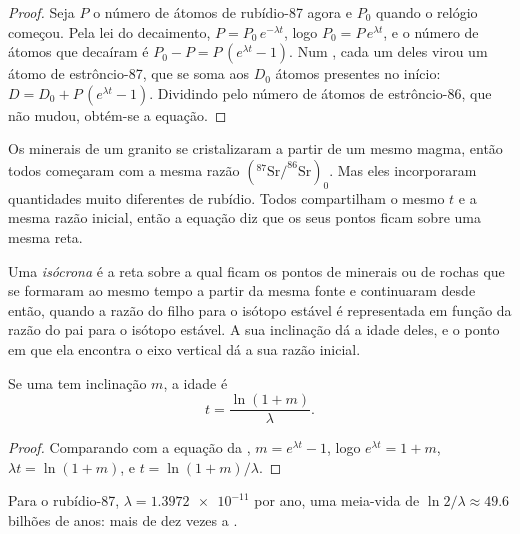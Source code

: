 \begin{proof}
Seja $P$ o número de átomos de rubídio-87 agora e $P_0$ quando o relógio
começou. Pela lei do decaimento, $P = P_0\,e^{-\lambda t}$, logo $P_0 = P\,e^{\lambda t}$,
e o número de átomos que decaíram é $P_0 - P = P\,(e^{\lambda t}-1)$.
Num , cada um deles virou um átomo de estrôncio-87, que se
soma aos $D_0$ átomos presentes no início: $D = D_0 + P\,(e^{\lambda
t}-1)$. Dividindo pelo número de átomos de estrôncio-86, que não mudou,
obtém-se a equação.
\end{proof}

Os minerais de um granito se cristalizaram a partir de um mesmo magma, então
todos começaram com a mesma razão $(^{87}\mathrm{Sr}/^{86}\mathrm{Sr})_0$.
Mas eles incorporaram quantidades muito diferentes de rubídio. Todos
compartilham o mesmo $t$ e a mesma razão inicial, então a equação diz que os
seus pontos ficam sobre uma mesma reta.

\begin{definition}[Isócrona]\label{def:g12:age-of-the-earth:isochron}
Uma \emph{isócrona} é a reta sobre a qual ficam os
pontos de minerais ou de rochas que se formaram ao mesmo tempo a partir da
mesma fonte e continuaram  desde então, quando a razão do
filho para o isótopo estável é representada em função da razão do pai para o
isótopo estável. A sua inclinação dá a idade deles, e o ponto em que ela
encontra o eixo vertical dá a sua razão inicial.
\end{definition}

\begin{proposition}\label{prop:g12:age-of-the-earth:slope}
Se uma  tem inclinação $m$, a idade é
\[
  t = \frac{\ln(1+m)}{\lambda}.
\]
\end{proposition}

\begin{proof}
Comparando com a equação da , $m = e^{\lambda t} - 1$, logo
$e^{\lambda t} = 1 + m$, $\lambda t = \ln(1+m)$, e $t = \ln(1+m)/\lambda$.
\end{proof}

Para o rubídio-87, $\lambda = \num{1.3972e-11}$ por ano, uma meia-vida de
$\ln 2/\lambda \approx 49.6$ bilhões de anos: mais de dez vezes a .

